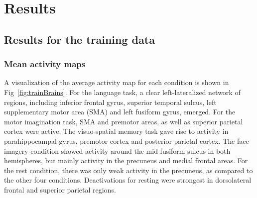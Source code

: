 \documentclass[fleqn,10pt]{SelfArx} %
\begin{document}
\section{Results}

\subsection{Results for the training data}

\subsubsection*{Mean activity maps}

A visualization of the average activity map for each condition is shown in Fig~\ref{fig:trainBrains}. For the language task, a clear left-lateralized network of regions, including inferior frontal gyrus, superior temporal sulcus, left supplementary motor area (SMA) and left fusiform gyrus, emerged. For the motor imagination task, SMA and premotor areas, as well as superior parietal cortex were active. The visuo-spatial memory task gave rise to activity in parahippocampal gyrus, premotor cortex and posterior parietal cortex. The face imagery condition showed activity around the mid-fusiform sulcus in both hemispheres, but mainly activity in the precuneus and medial frontal areas. For the rest condition, there was only weak activity in the precuneus, as compared to the other four conditions. Deactivations for resting were strongest in dorsolateral frontal and superior parietal regions.
\end{document}
